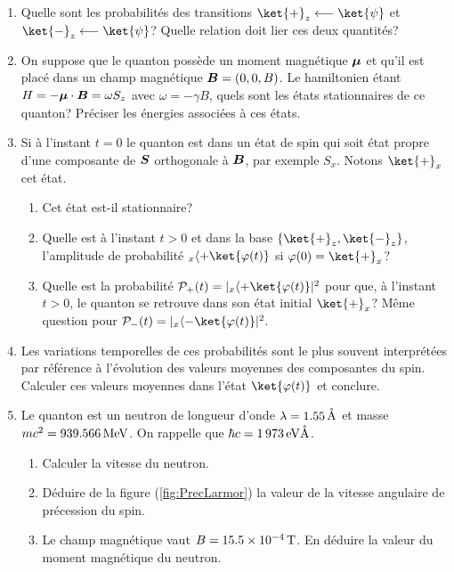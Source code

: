 \begin{enumerate}
\item Quelle sont les probabilités des transitions $\ket{+}_z\longleftarrow
\ket{\psi}$ et $\ket{-}_z\longleftarrow\ket{\psi}$? Quelle relation doit lier
ces deux quantités?

\item On suppose que le quanton possède un moment magnétique $\boldsymbol{\mu
}$ et qu'il est placé dans un champ magnétique $\boldsymbol{B}=(0,0,B)$. Le
hamiltonien étant $H=-\boldsymbol{\mu}\cdot\boldsymbol{B}=\omega S_z$ avec
$\omega=-\gamma B$, quels sont les états stationnaires de ce quanton? Préciser
les énergies associées à ces états.

\item Si à l'instant $t=0$ le quanton est dans un état de spin qui soit état
propre d'une composante de $\boldsymbol{S}$ orthogonale à $\boldsymbol{B}$,
par exemple $S_{x}$. Notons $\ket{+}_{x}$ cet état.

\begin{enumerate}
\item Cet état est-il stationnaire?

\item Quelle est à l'instant $t>0$ et dans la base $\{\ket{+}_z,\ket{-}_z
\}$, l'amplitude de probabilité $_{x}\langle+\ket{\varphi(t)}$ si
$\varphi(0)=\ket{+}_{x}$?

\item Quelle est la probabilité $\mathcal{P}_{+}(t)=|_{x}\langle
+\ket{\varphi(t)}|^{2}$ pour que, à l'instant $t>0$, le quanton se retrouve dans
son état initial $\ket{+}_{x}$? Même question pour $\mathcal{P}_{-}(t)=
|_{x}\langle -\ket{\varphi(t)}|^{2}$.
\end{enumerate}

\item Les variations temporelles de ces probabilités sont le plus souvent
interprétées par référence à l'évolution des valeurs moyennes des composantes
du spin. Calculer ces valeurs moyennes dans l'état $\ket{\varphi(t)}$ et
conclure.

\item Le quanton est un neutron de longueur d'onde
$\lambda=1.55\operatorname{\mathring{A}}$ et masse $mc^{2}=939.566\operatorname{MeV}$.
On rappelle que $\hbar c=1\,973\operatorname{eV\mathring{A}}$.

\begin{enumerate}
\item Calculer la vitesse du neutron.

\item Déduire de la figure (\ref{fig:PrecLarmor}) la valeur de la vitesse
angulaire de précession du spin.

\item Le champ magnétique vaut $B=15.5\times10^{-4}\operatorname{T}$. En déduire
la valeur du moment magnétique du neutron.
\end{enumerate}
\end{enumerate}

